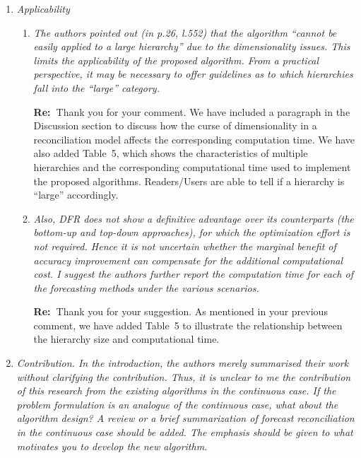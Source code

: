 \documentclass[11pt,a4paper]{article}
\newcommand{\RE}[2][Re:~]{{\color{blue}\textbf{#1}#2}}
\begin{document}
\begin{enumerate}%
\item \textit{Applicability}

  \begin{enumerate}
    \item \textit{The authors pointed out (in p.26, l.552) that the algorithm ``cannot be easily applied to a large hierarchy'' due to the dimensionality issues. This limits the applicability of the proposed algorithm. From a practical perspective, it may be necessary to offer guidelines as to which hierarchies fall into the ``large'' category. }

    \RE{Thank you for your comment. We have included a paragraph in the Discussion section to discuss how the curse of dimensionality in a reconciliation model affects the corresponding computation time. We have also added Table~5, which shows the characteristics of multiple hierarchies and the corresponding computational time used to implement the proposed algorithms. Readers/Users are able to tell if a hierarchy is ``large'' accordingly.}


    \item \textit{Also, DFR does not show a definitive advantage over its counterparts (the bottom-up and top-down approaches), for which the optimization effort is not required. Hence it is not uncertain whether the marginal benefit of accuracy improvement can compensate for the additional computational cost. I suggest the authors further report the computation time for each of the forecasting methods under the various scenarios.}

    \RE{Thank you for your suggestion. As mentioned in your previous comment, we have added Table~5 to illustrate the relationship between the hierarchy size and computational time.}


  \end{enumerate}

\item \textit{Contribution. In the introduction, the authors merely summarised their work without clarifying the contribution. Thus, it is unclear to me the contribution of this research from the existing algorithms in the continuous case. If the problem formulation is an analogue of the continuous case, what about the algorithm design? A review or a brief summarization of forecast reconciliation in the continuous case should be added. The emphasis should be given to what motivates you to develop the new algorithm.}


\end{enumerate}
\end{document}
